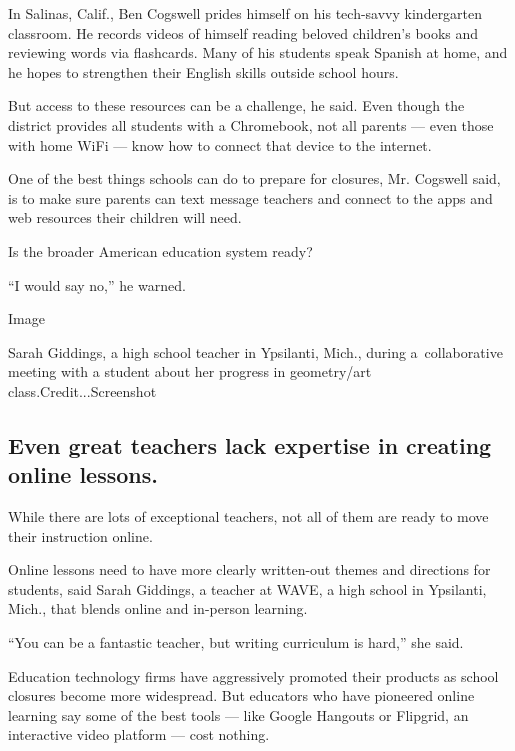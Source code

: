 In Salinas, Calif., Ben Cogswell prides himself on his tech-savvy
kindergarten classroom. He records videos of himself reading beloved
children's books and reviewing words via flashcards. Many of his
students speak Spanish at home, and he hopes to strengthen their English
skills outside school hours.

But access to these resources can be a challenge, he said. Even though
the district provides all students with a Chromebook, not all parents
--- even those with home WiFi --- know how to connect that device to the
internet.

One of the best things schools can do to prepare for closures, Mr.
Cogswell said, is to make sure parents can text message teachers and
connect to the apps and web resources their children will need.

Is the broader American education system ready?

``I would say no,'' he warned.

Image

Sarah Giddings, a high school teacher in Ypsilanti, Mich., during
a~collaborative meeting with a student about her progress in
geometry/art class.Credit...Screenshot

\hypertarget{even-great-teachers-lack-expertise-in-creating-online-lessons}{%
\subsection{Even great teachers lack expertise in creating online
lessons.}\label{even-great-teachers-lack-expertise-in-creating-online-lessons}}

While there are lots of exceptional teachers, not all of them are ready
to move their instruction online.

Online lessons need to have more clearly written-out themes and
directions for students, said Sarah Giddings, a teacher at WAVE, a high
school in Ypsilanti, Mich., that blends online and in-person learning.

``You can be a fantastic teacher, but writing curriculum is hard,'' she
said.

Education technology firms have aggressively promoted their products as
school closures become more widespread. But educators who have pioneered
online learning say some of the best tools --- like Google Hangouts or
Flipgrid, an interactive video platform --- cost nothing.

\href{https://www.nytimes3xbfgragh.onion/spotlight/schools-reopening?action=click\&pgtype=Article\&state=default\&region=MAIN_CONTENT_3\&context=storylines_keepup}{}

